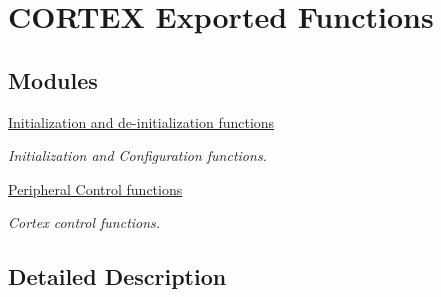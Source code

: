\hypertarget{group___c_o_r_t_e_x___exported___functions}{}\section{C\+O\+R\+T\+EX Exported Functions}
\label{group___c_o_r_t_e_x___exported___functions}
\subsection*{Modules}
\begin{DoxyCompactItemize}
\item 
\hyperlink{group___c_o_r_t_e_x___exported___functions___group1}{Initialization and de-\/initialization functions}
\begin{DoxyCompactList}\small\item\em Initialization and Configuration functions. \end{DoxyCompactList}\item 
\hyperlink{group___c_o_r_t_e_x___exported___functions___group2}{Peripheral Control functions}
\begin{DoxyCompactList}\small\item\em Cortex control functions. \end{DoxyCompactList}\end{DoxyCompactItemize}


\subsection{Detailed Description}
